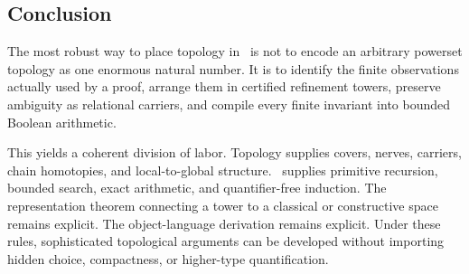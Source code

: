 \subsection{Conclusion}

The most robust way to place topology in \ipra\ is not to encode an arbitrary powerset topology as one enormous natural number.  It is to identify the finite observations actually used by a proof, arrange them in certified refinement towers, preserve ambiguity as relational carriers, and compile every finite invariant into bounded Boolean arithmetic.

This yields a coherent division of labor.  Topology supplies covers, nerves, carriers, chain homotopies, and local-to-global structure.  \ipra\ supplies primitive recursion, bounded search, exact arithmetic, and quantifier-free induction.  The representation theorem connecting a tower to a classical or constructive space remains explicit.  The object-language derivation remains explicit.  Under these rules, sophisticated topological arguments can be developed without importing hidden choice, compactness, or higher-type quantification.
